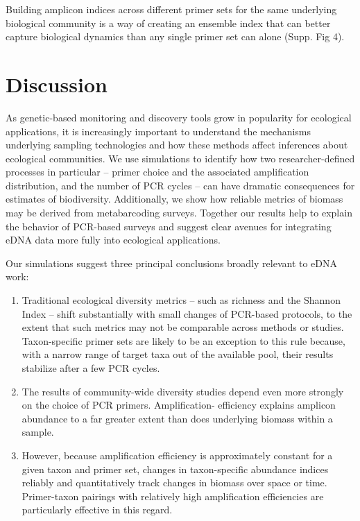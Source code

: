 \documentclass[fleqn,11pt,lineno]{wlscirep}
\begin{document}
Building amplicon indices across different primer sets for the same underlying biological community \cite{djurhuus2019eDNA} is a way of creating an ensemble index that can better capture biological dynamics than any single primer set can alone (Supp. Fig 4).


\section{Discussion}\label{discussion}

As genetic-based monitoring and discovery tools grow in popularity for ecological applications, it is increasingly important to understand the mechanisms underlying sampling technologies and how these methods affect inferences about ecological communities. We use simulations to identify how two researcher-defined processes in particular -- primer choice and the associated amplification distribution, and the number of PCR cycles -- can have dramatic consequences for estimates of biodiversity.  Additionally, we show how reliable metrics of biomass may be derived from metabarcoding surveys. Together our results help to explain the behavior of PCR-based surveys and suggest clear avenues for integrating eDNA data more fully into ecological applications.

Our simulations suggest three principal conclusions broadly relevant to eDNA work:

\begin{enumerate}
	\item Traditional ecological diversity metrics -- such as richness and the Shannon Index -- shift substantially with small changes of PCR-based protocols, to the extent that such metrics may not be comparable across methods or studies. Taxon-specific primer sets are likely to be an exception to this rule because, with a narrow range of target taxa out of the available pool, their results stabilize after a few PCR cycles.
	\item The results of community-wide diversity studies depend even more strongly on the choice of PCR primers. Amplification- efficiency explains amplicon abundance to a far greater extent than does underlying biomass within a sample.   
	\item However, because amplification efficiency is approximately constant for a given taxon and primer set, changes in taxon-specific abundance indices reliably and quantitatively track changes in biomass over space or time. Primer-taxon pairings with relatively high amplification efficiencies are particularly effective in this regard.
	\end{enumerate}
\end{document}
